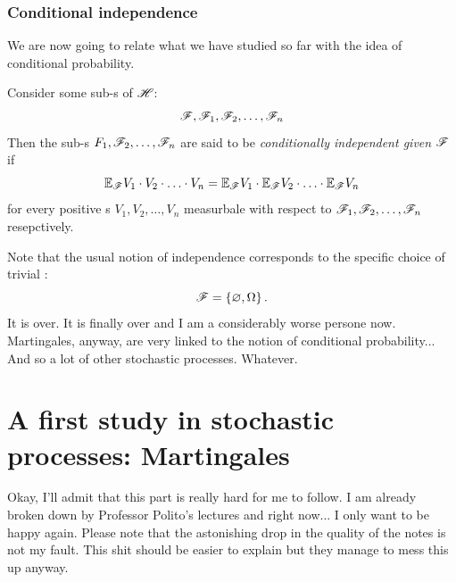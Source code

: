 \documentclass{report}
\begin{document}
\subsection{Conditional independence}
We are now going to relate what we have studied so far with the idea of conditional probability. \\
\begin{definition}
	Consider some sub-\sa s of $\mathscr{H}$:
\[\mathscr{F},\mathscr{F}_1,\mathscr{F}_2,\ldots,\mathscr{F}_n\]
Then the sub-\sa{}s $F_1,\mathscr{F}_2,\ldots,\mathscr{F}_n$ are said to be \emph{conditionally independent given $\mathscr{F}$} if
\begin{equation*}
	\mathbb{E}_{\mathscr{F}} V_1\cdot V_2\cdot\ldots\cdot V_n=\mathbb{E}_{\mathscr{F}} V_1\cdot\mathbb{E}_{\mathscr{F}} V_2\cdot\ldots\cdot\mathbb{E}_{\mathscr{F}} V_n
\end{equation*}
for every positive \rv s $V_1,V_2,\ldots,V_n$ measurbale with respect to $\mathscr{F}_1,\mathscr{F}_2,\ldots,\mathscr{F}_n$ resepctively.
\end{definition}
Note that the usual notion of independence corresponds to the specific choice of trivial \sa:
\begin{equation*}
	\mathscr{F}=\left\{\varnothing,\Omega\right\}.
\end{equation*}
It is over. It is finally over and I am a considerably worse persone now. Martingales, anyway, are very linked to the notion of conditional probability... And so a lot of other stochastic processes. Whatever.

\chapter{A first study in stochastic processes: Martingales}
Okay, I'll admit that this part is really hard for me to follow. I am already broken down by Professor Polito's lectures and right now... I only want to be happy again. Please note that the astonishing drop in the quality of the notes is not my fault. This shit should be easier to explain but they manage to mess this up anyway. 
\end{document}
